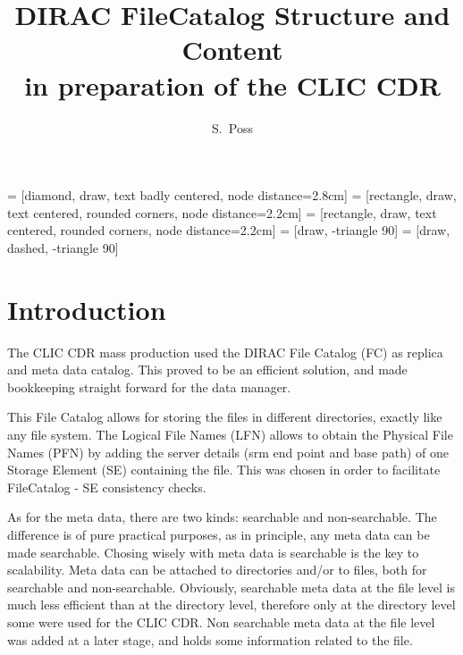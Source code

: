 \documentclass[11pt,a4paper]{scrartcl}
\begin{document}
\begin{titlepage}
%
\mydocversion
\title{DIRAC FileCatalog Structure and Content\\ in preparation of the CLIC CDR}
\author{S.~Poss}
 = [diamond, draw, text badly centered, node distance=2.8cm]
 = [rectangle, draw, text centered, rounded corners, node distance=2.2cm]
 = [rectangle, draw, text centered, rounded corners, node distance=2.2cm]
 = [draw, -triangle 90]
 = [draw, dashed, -triangle 90]

{}

\tableofcontents
\end{titlepage}

\section{Introduction}
The CLIC CDR mass production used the DIRAC File Catalog (FC)\cite{diracfc} as
replica and meta data catalog. This proved to be an efficient solution, and made bookkeeping
straight forward for the data manager. 

This File Catalog allows for storing the files in different directories,
exactly like any file system. The Logical File Names (LFN) allows to obtain the 
Physical File Names (PFN) by adding the server details (srm end point and base 
path) of one Storage Element (SE) containing the file. This was chosen in order 
to facilitate FileCatalog - SE consistency checks.

As for the meta data, there are two kinds: searchable and non-searchable.
The difference is of pure practical purposes, as in principle, any meta data
can be made searchable. Chosing wisely with meta data is searchable is the key
to scalability. Meta data can be attached to directories and/or to files, both
for searchable and non-searchable. Obviously, searchable meta data at the file 
level is much less efficient than at the directory level, therefore only at the
directory level some were used for the CLIC CDR. Non searchable meta data at
the file level was added at a later stage, and holds some information related 
to the file.
\end{document}
